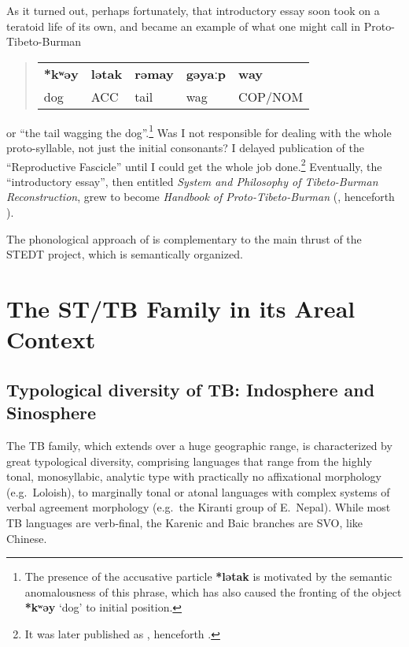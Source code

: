 As it turned out, perhaps fortunately, that introductory essay soon took on a teratoid life of its own, and became an example of what one might call in Proto-Tibeto-Burman 
\begin{quote}
\begin{center}
\begin{tabular}{l l l l l}
\textbf{*kʷəy} & \textbf{lətak} & \textbf{rəmay} & \textbf{gəyaːp} & \textbf{way}\\
dog & ACC & tail & wag & COP/NOM
\end{tabular}
\end{center}
\end{quote}
or “the tail wagging the dog”.\footnote{The presence of the accusative particle \textbf{*lətak} is motivated by the semantic anomalousness of this phrase, which has also caused the fronting of the object \textbf{*kʷəy} ‘dog’ to initial position.} Was I not responsible for dealing with the whole proto-syllable, not just the initial consonants? I delayed publication of the “Reproductive Fascicle” until I could get the whole job done.\footnote{It was later published as \citealt{JAM-TBRS}, henceforth \textit{}.}
Eventually, the “introductory essay”, then entitled \textit{System and Philosophy of Tibeto-Burman Reconstruction}, grew to become \textit{Handbook of Proto-Tibeto-Burman} (\citealt{JAM-HPTB}, henceforth \textit{}).


The phonological approach of \textit{} is complementary to the main thrust of the STEDT project, which is semantically organized.

\section{The ST/TB Family in its Areal Context}

\subsection{Typological diversity of TB: Indosphere and Sinosphere}

The TB family, which extends over a huge geographic range, is characterized by great typological diversity, comprising languages that range from the highly tonal, monosyllabic, analytic type with practically no affixational morphology (e.g.\ Loloish), to marginally tonal or atonal languages with complex systems of verbal agreement morphology (e.g.\ the Kiranti group of E.\ Nepal). While most TB languages are verb-final, the Karenic and Baic branches are SVO, like Chinese.
 
